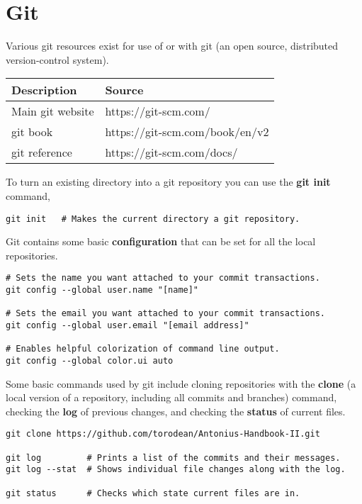 \chapter{Git}
\thispagestyle{fancy}
\lstset{language=Bash, style=bash}

\begin{fancybox}{}	
	Various git resources exist for use of or with git (an open source, distributed version-control system).
	\begin{center}
		\begin{tabular}{l|l}
			Description & Source \\
			\hline
			Main git website & https://git-scm.com/ \\
			git book & https://git-scm.com/book/en/v2 \\
			git reference & https://git-scm.com/docs/
		\end{tabular}
	\end{center}
\end{fancybox}

To turn an existing directory into a git repository you can use the \textbf{git init} command,
\begin{lstlisting}
git init   # Makes the current directory a git repository.
\end{lstlisting}

Git contains some basic \textbf{configuration} that can be set for all the local repositories.
\begin{lstlisting}
# Sets the name you want attached to your commit transactions.
git config --global user.name "[name]"

# Sets the email you want attached to your commit transactions.
git config --global user.email "[email address]"

# Enables helpful colorization of command line output.
git config --global color.ui auto
\end{lstlisting}

Some basic commands used by git include cloning repositories with the \textbf{clone} (a local version of a repository, including all commits and branches) command, checking the \textbf{log} of previous changes, and checking the \textbf{status} of current files.
\begin{lstlisting}
git clone https://github.com/torodean/Antonius-Handbook-II.git

git log         # Prints a list of the commits and their messages.
git log --stat  # Shows individual file changes along with the log.

git status      # Checks which state current files are in.
\end{lstlisting}

